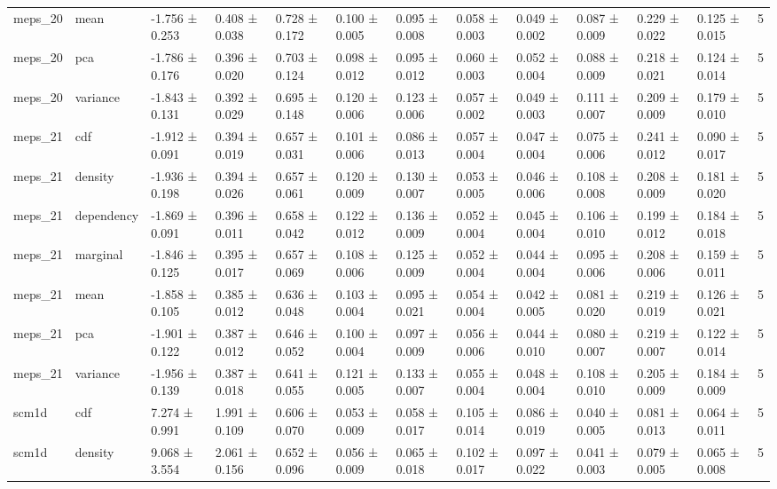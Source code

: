 \begin{table}
\begin{tabular}{llllllllllllr}
meps_20 & mean & -1.756 ± 0.253 & 0.408 ± 0.038 & 0.728 ± 0.172 & 0.100 ± 0.005 & 0.095 ± 0.008 & 0.058 ± 0.003 & 0.049 ± 0.002 & 0.087 ± 0.009 & 0.229 ± 0.022 & 0.125 ± 0.015 & 5 \\
meps_20 & pca & -1.786 ± 0.176 & 0.396 ± 0.020 & 0.703 ± 0.124 & 0.098 ± 0.012 & 0.095 ± 0.012 & 0.060 ± 0.003 & 0.052 ± 0.004 & 0.088 ± 0.009 & 0.218 ± 0.021 & 0.124 ± 0.014 & 5 \\
meps_20 & variance & -1.843 ± 0.131 & 0.392 ± 0.029 & 0.695 ± 0.148 & 0.120 ± 0.006 & 0.123 ± 0.006 & 0.057 ± 0.002 & 0.049 ± 0.003 & 0.111 ± 0.007 & 0.209 ± 0.009 & 0.179 ± 0.010 & 5 \\
meps_21 & cdf & -1.912 ± 0.091 & 0.394 ± 0.019 & 0.657 ± 0.031 & 0.101 ± 0.006 & 0.086 ± 0.013 & 0.057 ± 0.004 & 0.047 ± 0.004 & 0.075 ± 0.006 & 0.241 ± 0.012 & 0.090 ± 0.017 & 5 \\
meps_21 & density & -1.936 ± 0.198 & 0.394 ± 0.026 & 0.657 ± 0.061 & 0.120 ± 0.009 & 0.130 ± 0.007 & 0.053 ± 0.005 & 0.046 ± 0.006 & 0.108 ± 0.008 & 0.208 ± 0.009 & 0.181 ± 0.020 & 5 \\
meps_21 & dependency & -1.869 ± 0.091 & 0.396 ± 0.011 & 0.658 ± 0.042 & 0.122 ± 0.012 & 0.136 ± 0.009 & 0.052 ± 0.004 & 0.045 ± 0.004 & 0.106 ± 0.010 & 0.199 ± 0.012 & 0.184 ± 0.018 & 5 \\
meps_21 & marginal & -1.846 ± 0.125 & 0.395 ± 0.017 & 0.657 ± 0.069 & 0.108 ± 0.006 & 0.125 ± 0.009 & 0.052 ± 0.004 & 0.044 ± 0.004 & 0.095 ± 0.006 & 0.208 ± 0.006 & 0.159 ± 0.011 & 5 \\
meps_21 & mean & -1.858 ± 0.105 & 0.385 ± 0.012 & 0.636 ± 0.048 & 0.103 ± 0.004 & 0.095 ± 0.021 & 0.054 ± 0.004 & 0.042 ± 0.005 & 0.081 ± 0.020 & 0.219 ± 0.019 & 0.126 ± 0.021 & 5 \\
meps_21 & pca & -1.901 ± 0.122 & 0.387 ± 0.012 & 0.646 ± 0.052 & 0.100 ± 0.004 & 0.097 ± 0.009 & 0.056 ± 0.006 & 0.044 ± 0.010 & 0.080 ± 0.007 & 0.219 ± 0.007 & 0.122 ± 0.014 & 5 \\
meps_21 & variance & -1.956 ± 0.139 & 0.387 ± 0.018 & 0.641 ± 0.055 & 0.121 ± 0.005 & 0.133 ± 0.007 & 0.055 ± 0.004 & 0.048 ± 0.004 & 0.108 ± 0.010 & 0.205 ± 0.009 & 0.184 ± 0.009 & 5 \\
scm1d & cdf & 7.274 ± 0.991 & 1.991 ± 0.109 & 0.606 ± 0.070 & 0.053 ± 0.009 & 0.058 ± 0.017 & 0.105 ± 0.014 & 0.086 ± 0.019 & 0.040 ± 0.005 & 0.081 ± 0.013 & 0.064 ± 0.011 & 5 \\
scm1d & density & 9.068 ± 3.554 & 2.061 ± 0.156 & 0.652 ± 0.096 & 0.056 ± 0.009 & 0.065 ± 0.018 & 0.102 ± 0.017 & 0.097 ± 0.022 & 0.041 ± 0.003 & 0.079 ± 0.005 & 0.065 ± 0.008 & 5 \\

\end{tabular}
\end{table}
